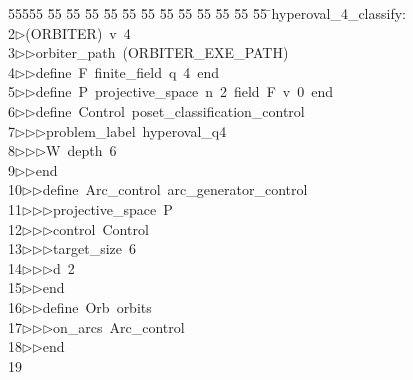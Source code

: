 %
%
\begin{tabbing}
55555 \= 55 \= 55 \= 55 \= 55 \= 55 \= 55 \= 55 \= 55 \= 55 \= 55 \= 55 \= 55 \= \>hyperoval\_4\_classify:\\[0pt]
2\>$\triangleright$\>(ORBITER)\ v\ 4\ \\[0pt]
3\>$\triangleright$\>$\triangleright$\>orbiter\_path\ (ORBITER\_EXE\_PATH)\ \\[0pt]
4\>$\triangleright$\>$\triangleright$\>define\ F\ finite\_field\ q\ 4\ end\ \\[0pt]
5\>$\triangleright$\>$\triangleright$\>define\ P\ projective\_space\ n\ 2\ field\ F\ v\ 0\ end\ \\[0pt]
6\>$\triangleright$\>$\triangleright$\>define\ Control\ poset\_classification\_control\ \\[0pt]
7\>$\triangleright$\>$\triangleright$\>$\triangleright$\>problem\_label\ hyperoval\_q4\ \\[0pt]
8\>$\triangleright$\>$\triangleright$\>$\triangleright$\>W\ depth\ 6\ \\[0pt]
9\>$\triangleright$\>$\triangleright$\>end\ \\[0pt]
10\>$\triangleright$\>$\triangleright$\>define\ Arc\_control\ arc\_generator\_control\ \\[0pt]
11\>$\triangleright$\>$\triangleright$\>$\triangleright$\>projective\_space\ P\ \\[0pt]
12\>$\triangleright$\>$\triangleright$\>$\triangleright$\>control\ Control\ \\[0pt]
13\>$\triangleright$\>$\triangleright$\>$\triangleright$\>target\_size\ 6\ \\[0pt]
14\>$\triangleright$\>$\triangleright$\>$\triangleright$\>d\ 2\ \\[0pt]
15\>$\triangleright$\>$\triangleright$\>end\ \\[0pt]
16\>$\triangleright$\>$\triangleright$\>define\ Orb\ orbits\ \\[0pt]
17\>$\triangleright$\>$\triangleright$\>$\triangleright$\>on\_arcs\ Arc\_control\ \\[0pt]
18\>$\triangleright$\>$\triangleright$\>end\\[0pt]
19\>\end{tabbing}
